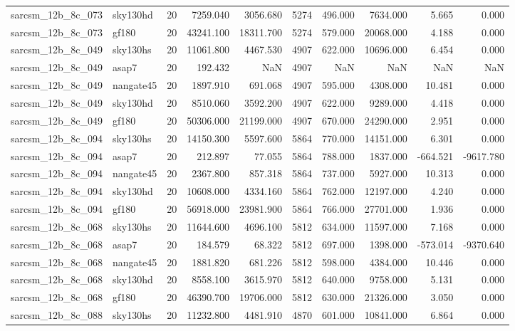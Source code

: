 \begin{tabular}{llrrrrrrrr}
sarcsm\_12b\_8c\_073 & sky130hd & 20 & 7259.040 & 3056.680 & 5274 & 496.000 & 7634.000 & 5.665 & 0.000 \\
sarcsm\_12b\_8c\_073 & gf180 & 20 & 43241.100 & 18311.700 & 5274 & 579.000 & 20068.000 & 4.188 & 0.000 \\
sarcsm\_12b\_8c\_049 & sky130hs & 20 & 11061.800 & 4467.530 & 4907 & 622.000 & 10696.000 & 6.454 & 0.000 \\
sarcsm\_12b\_8c\_049 & asap7 & 20 & 192.432 & NaN & 4907 & NaN & NaN & NaN & NaN \\
sarcsm\_12b\_8c\_049 & nangate45 & 20 & 1897.910 & 691.068 & 4907 & 595.000 & 4308.000 & 10.481 & 0.000 \\
sarcsm\_12b\_8c\_049 & sky130hd & 20 & 8510.060 & 3592.200 & 4907 & 622.000 & 9289.000 & 4.418 & 0.000 \\
sarcsm\_12b\_8c\_049 & gf180 & 20 & 50306.000 & 21199.000 & 4907 & 670.000 & 24290.000 & 2.951 & 0.000 \\
sarcsm\_12b\_8c\_094 & sky130hs & 20 & 14150.300 & 5597.600 & 5864 & 770.000 & 14151.000 & 6.301 & 0.000 \\
sarcsm\_12b\_8c\_094 & asap7 & 20 & 212.897 & 77.055 & 5864 & 788.000 & 1837.000 & -664.521 & -9617.780 \\
sarcsm\_12b\_8c\_094 & nangate45 & 20 & 2367.800 & 857.318 & 5864 & 737.000 & 5927.000 & 10.313 & 0.000 \\
sarcsm\_12b\_8c\_094 & sky130hd & 20 & 10608.000 & 4334.160 & 5864 & 762.000 & 12197.000 & 4.240 & 0.000 \\
sarcsm\_12b\_8c\_094 & gf180 & 20 & 56918.000 & 23981.900 & 5864 & 766.000 & 27701.000 & 1.936 & 0.000 \\
sarcsm\_12b\_8c\_068 & sky130hs & 20 & 11644.600 & 4696.100 & 5812 & 634.000 & 11597.000 & 7.168 & 0.000 \\
sarcsm\_12b\_8c\_068 & asap7 & 20 & 184.579 & 68.322 & 5812 & 697.000 & 1398.000 & -573.014 & -9370.640 \\
sarcsm\_12b\_8c\_068 & nangate45 & 20 & 1881.820 & 681.226 & 5812 & 598.000 & 4384.000 & 10.446 & 0.000 \\
sarcsm\_12b\_8c\_068 & sky130hd & 20 & 8558.100 & 3615.970 & 5812 & 640.000 & 9758.000 & 5.131 & 0.000 \\
sarcsm\_12b\_8c\_068 & gf180 & 20 & 46390.700 & 19706.000 & 5812 & 630.000 & 21326.000 & 3.050 & 0.000 \\
sarcsm\_12b\_8c\_088 & sky130hs & 20 & 11232.800 & 4481.910 & 4870 & 601.000 & 10841.000 & 6.864 & 0.000 \\

\end{tabular}
